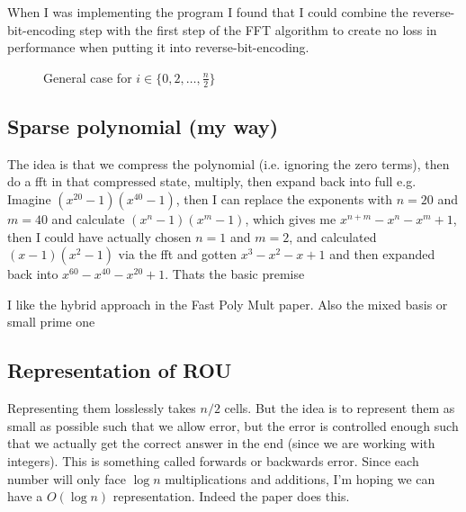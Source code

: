 When I was implementing the program I found that I could combine the reverse-bit-encoding step with the first step of the FFT algorithm to create no loss in performance when putting it into reverse-bit-encoding.
\begin{figure}
    \centering
    \caption{General case for $i \in \{0, 2, \ldots, \frac{n}{2}\}$}
\end{figure}

\subsection{Sparse polynomial (my way)}

The idea is that we compress the polynomial (i.e. ignoring the zero terms), then do a fft in that compressed state, multiply, then expand back into full
e.g. Imagine $(x^{20} - 1)(x^{40} - 1)$, then I can replace the exponents with $n = 20$ and $m = 40$ and calculate $(x^n - 1)(x^m -1)$, which gives me $x^{n+m} - x^n - x^m + 1$, then I could have actually chosen $n = 1$ and $m = 2$, and calculated $(x - 1)(x^2 - 1)$ via the fft and gotten $x^3 - x^2 - x + 1$ and then expanded back into $x^{60} - x^{40} - x^{20} + 1$. Thats the basic premise

I like the hybrid approach in the Fast Poly Mult paper. Also the mixed basis or small prime one

\subsection{Representation of ROU}

Representing them losslessly takes $n/2$ cells. But the idea is to represent them as small as possible such that we allow error, but the error is controlled enough such that we actually get the correct answer in the end (since we are working with integers). This is something called forwards or backwards error. Since each number will only face $\log n$ multiplications and additions, I'm hoping we can have a $O(\log n)$ representation. Indeed the \cite{nlogn} paper does this.

